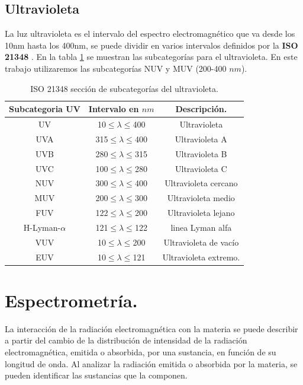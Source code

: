 \subsection{Ultravioleta}
La luz ultravioleta es el intervalo del espectro electromagnético que va desde los 10nm hasta los 400nm, se puede dividir en varios intervalos definidos por la \textbf{ISO 21348} \cite{Solar}. En la tabla \ref{tabla:UV} se muestran las subcategorías para el ultravioleta. En este trabajo utilizaremos las subcategorías NUV y MUV (200-400 $nm$). 
\begin{table}
	\centering
	\caption{ISO 21348 sección de subcategorías del ultravioleta. \cite{Solar}} 
	\label{tabla:UV}
	\begin{tabular}{|c c c|}
		\hline
		Subcategoria UV & Intervalo en \textbf{$nm$} & Descripción. \\
		\hline
		UV & 10$\leq\lambda\leq$400 & Ultravioleta \\
		\hline
		\hline
		UVA & 315$\leq\lambda\leq$400 & Ultravioleta A\\
		UVB & 280$\leq\lambda\leq$315 & Ultravioleta B\\
		UVC & 100$\leq\lambda\leq$280 & Ultravioleta C\\
		\hline
		\hline
		NUV & 300$\leq\lambda\leq$400 & Ultravioleta cercano\\
		MUV & 200$\leq\lambda\leq$300 & Ultravioleta medio\\
		FUV & 122$\leq\lambda\leq$200 & Ultravioleta lejano\\
		H-Lyman-$\alpha$ & 121$\leq\lambda\leq$122 &  linea Lyman alfa\\
		\hline\hline
		VUV & 10$\leq\lambda\leq$200 & Ultravioleta de vacío\\
		EUV & 10$\leq\lambda\leq$121 & Ultravioleta extremo.\\
		\hline
	\end{tabular}
\end{table}

\section{Espectrometría.}
La interacción de la radiación electromagnética con la materia se puede describir a partir del cambio de la distribución de intensidad de la radiación electromagnética, emitida o absorbida, por una sustancia, en función de su longitud de onda. Al analizar la radiación emitida o absorbida por la materia, se pueden identificar las sustancias que la componen. 


